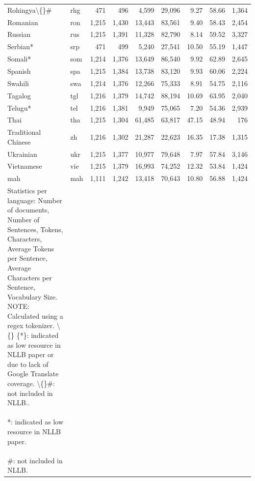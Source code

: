 \begin{table}[t]
\begin{tabular}{l l r r r r r r r}
Rohingya\textbackslash\{\}\# & rhg & 471 & 496 & 4,599 & 29,096 & 9.27 & 58.66 & 1,364 \\
Romanian & ron & 1,215 & 1,430 & 13,443 & 83,561 & 9.40 & 58.43 & 2,454 \\
Russian & rus & 1,215 & 1,391 & 11,328 & 82,790 & 8.14 & 59.52 & 3,327 \\
Serbian* & srp & 471 & 499 & 5,240 & 27,541 & 10.50 & 55.19 & 1,447 \\
Somali* & som & 1,214 & 1,376 & 13,649 & 86,540 & 9.92 & 62.89 & 2,645 \\
Spanish & spa & 1,215 & 1,384 & 13,738 & 83,120 & 9.93 & 60.06 & 2,224 \\
Swahili & swa & 1,214 & 1,376 & 12,266 & 75,333 & 8.91 & 54.75 & 2,116 \\
Tagalog & tgl & 1,216 & 1,379 & 14,742 & 88,194 & 10.69 & 63.95 & 2,040 \\
Telugu* & tel & 1,216 & 1,381 & 9,949 & 75,065 & 7.20 & 54.36 & 2,939 \\
Thai & tha & 1,215 & 1,304 & 61,485 & 63,817 & 47.15 & 48.94 & 176 \\
Traditional Chinese & zh & 1,216 & 1,302 & 21,287 & 22,623 & 16.35 & 17.38 & 1,315 \\
Ukrainian & ukr & 1,215 & 1,377 & 10,977 & 79,648 & 7.97 & 57.84 & 3,146 \\
Vietnamese & vie & 1,215 & 1,379 & 16,993 & 74,252 & 12.32 & 53.84 & 1,424 \\
mah & mah & 1,111 & 1,242 & 13,418 & 70,643 & 10.80 & 56.88 & 1,424 \\
\bottomrule
\caption{Statistics per language: Number of documents, Number of Sentences, Tokens, Characters, Average Tokens per Sentence, Average Characters per Sentence, Vocabulary Size. NOTE: Calculated using a regex tokenizer. \textbackslash\{\} \{*\}: indicated as low resource in NLLB paper or due to lack of Google Translate coverage. \textbackslash\{\}\#: not included in NLLB.. \\\\ *: indicated as low resource in NLLB paper. \\\\ \#: not included in NLLB.}
\label{tab:portland\_per\_language\_stats}
\end{tabular}
\end{table}
